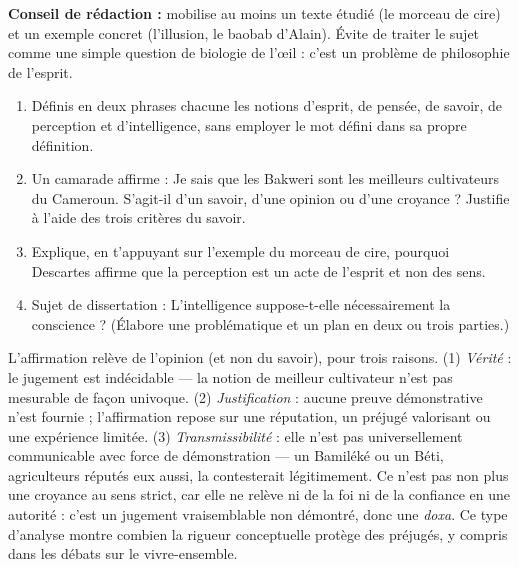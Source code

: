 \documentclass[11pt]{article}
\newcommand{\cle}[1]{{\popxbold\color{popdark}#1}}
\begin{document}
\begin{exoresolu}
\textbf{Conseil de rédaction :} mobilise au moins un texte étudié (le morceau de cire) et un exemple concret (l'illusion, le baobab d'Alain). Évite de traiter le sujet comme une simple question de biologie de l'œil : c'est un problème de philosophie de l'esprit.
\end{exoresolu}

\begin{exercice}
\begin{enumerate}
\item Définis en deux phrases chacune les notions d'esprit, de pensée, de savoir, de perception et d'intelligence, sans employer le mot défini dans sa propre définition.
\item Un camarade affirme : \guillemotleft Je sais que les Bakweri sont les meilleurs cultivateurs du Cameroun. \guillemotright S'agit-il d'un savoir, d'une opinion ou d'une croyance ? Justifie à l'aide des trois critères du savoir.
\item Explique, en t'appuyant sur l'exemple du morceau de cire, pourquoi Descartes affirme que la perception est un acte de l'esprit et non des sens.
\item Sujet de dissertation : \guillemotleft L'intelligence suppose-t-elle nécessairement la conscience ? \guillemotright (Élabore une problématique et un plan en deux ou trois parties.)
\end{enumerate}
\end{exercice}

\begin{corrige}[Exercice 2]
L'affirmation relève de l'\cle{opinion} (et non du savoir), pour trois raisons. (1) \emph{Vérité} : le jugement est indécidable — la notion de \guillemotleft meilleur cultivateur \guillemotright n'est pas mesurable de façon univoque. (2) \emph{Justification} : aucune preuve démonstrative n'est fournie ; l'affirmation repose sur une réputation, un préjugé valorisant ou une expérience limitée. (3) \emph{Transmissibilité} : elle n'est pas universellement communicable avec force de démonstration — un Bamiléké ou un Béti, agriculteurs réputés eux aussi, la contesterait légitimement. Ce n'est pas non plus une croyance au sens strict, car elle ne relève ni de la foi ni de la confiance en une autorité : c'est un jugement vraisemblable non démontré, donc une \emph{doxa}. Ce type d'analyse montre combien la rigueur conceptuelle protège des préjugés, y compris dans les débats sur le vivre-ensemble.
\end{corrige}
\end{document}
